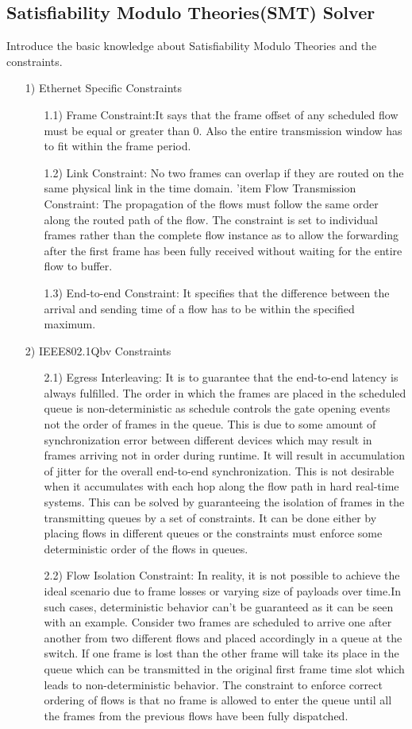 \documentclass[conference]{IEEEtran}
\begin{document}
\subsection{Satisfiability Modulo Theories(SMT) Solver}
Introduce the basic knowledge about Satisfiability Modulo Theories and the constraints. 
\begin{itemize}
    \item[1)] Ethernet Specific Constraints
    \begin{itemize}
        \item[1.1)] Frame Constraint:It says that the frame offset of any scheduled flow must be equal or greater than 0. Also the entire transmission window has to fit within the frame period.
        \item[1.2)] Link Constraint: No two frames can overlap if they are routed on the same physical link in the time domain. ’item Flow Transmission Constraint: The propagation of the flows must follow the same order along the routed path of the flow. The constraint is set to individual frames rather than the complete flow instance as to allow the forwarding after the first frame has been fully received without waiting for the entire flow to buffer.
        \item[1.3)] End-to-end Constraint: It specifies that the difference between the arrival and sending time of a flow has to be within the specified maximum.
    \end{itemize}
    \item[2)] IEEE802.1Qbv Constraints
    \begin{itemize}
        \item[2.1)] Egress Interleaving: 
        It is to guarantee that the end-to-end latency is always fulfilled. The order in which the frames are placed in the scheduled queue is non-deterministic as schedule controls the gate opening events not the order of frames in the queue. This is due to some amount of synchronization error between different devices which may result in frames arriving not in order during runtime. It will result in accumulation of jitter for the overall end-to-end synchronization. This is not desirable when it accumulates with each hop along the flow path in hard real-time systems. This can be solved by guaranteeing the isolation of frames in the transmitting queues by a set of constraints. It can be done either by placing flows in different queues or the constraints must enforce some deterministic order of the flows in queues.
        \item[2.2)] Flow Isolation Constraint: In reality, it is not possible to achieve the ideal scenario due to frame losses or varying size of payloads over time.In such cases, deterministic behavior can’t be guaranteed as it can be seen with an example. Consider two frames are scheduled to arrive one after another from two different flows and placed accordingly in a queue at the switch. If one frame is lost than the other frame will take its place in the queue which can be transmitted in the original first frame time slot which leads to non-deterministic behavior. The constraint to enforce correct ordering of flows is that no frame is allowed to enter the queue until all the frames from the previous flows have been fully dispatched.

\end{itemize}
\end{itemize}
\end{document}
